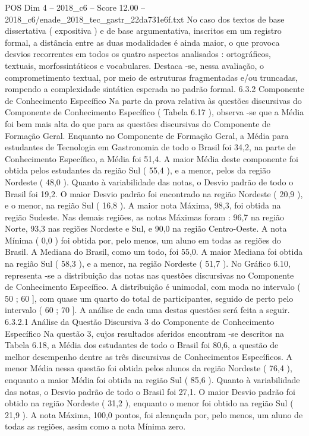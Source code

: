 \begin{textsample}{POS Dim 4 – 2018\_c6 – Score 12.00 – 2018\_c6/enade\_2018\_tec\_gastr\_22da731e6f.txt}
No caso dos textos de base dissertativa ( expositiva ) e de base argumentativa, inscritos em um registro formal, a distância entre as duas modalidades é ainda maior, o que provoca desvios recorrentes em todos os quatro aspectos analisados : ortográficos, textuais, morfossintáticos e vocabulares.
Destaca -se, nessa avaliação, o comprometimento textual, por meio de estruturas fragmentadas e/ou truncadas, rompendo a complexidade sintática esperada no padrão formal. 6.3.2 Componente de Conhecimento Específico Na parte da prova relativa às questões discursivas do Componente de Conhecimento Específico ( Tabela 6.17 ), observa -se que a Média foi bem mais alta do que para as questões discursivas do Componente de Formação Geral.
Enquanto no Componente de Formação Geral, a Média para estudantes de Tecnologia em Gastronomia de todo o Brasil foi 34,2, na parte de Conhecimento Específico, a Média foi 51,4.
A maior Média deste componente foi obtida pelos estudantes da região Sul ( 55,4 ), e a menor, pelos da região Nordeste ( 48,0 ).
Quanto à variabilidade das notas, o Desvio padrão de todo o Brasil foi 19,2.
O maior Desvio padrão foi encontrado na região Nordeste ( 20,9 ), e o menor, na região Sul ( 16,8 ).
A maior nota Máxima, 98,3, foi obtida na região Sudeste.
Nas demais regiões, as notas Máximas foram : 96,7 na região Norte, 93,3 nas regiões Nordeste e Sul, e 90,0 na região Centro-Oeste.
A nota Mínima ( 0,0 ) foi obtida por, pelo menos, um aluno em todas as regiões do Brasil.
A Mediana do Brasil, como um todo, foi 55,0.
A maior Mediana foi obtida na região Sul ( 58,3 ), e a menor, na região Nordeste ( 51,7 ).
No Gráfico 6.10, representa -se a distribuição das notas nas questões discursivas no Componente de Conhecimento Específico.
A distribuição é unimodal, com moda no intervalo ( 50 ; 60 ], com quase um quarto do total de participantes, seguido de perto pelo intervalo ( 60 ; 70 ].
A análise de cada uma destas questões será feita a seguir. 6.3.2.1 Análise da Questão Discursiva 3 do Componente de Conhecimento Específico Na questão 3, cujos resultados aferidos encontram -se descritos na Tabela 6.18, a Média dos estudantes de todo o Brasil foi 80,6, a questão de melhor desempenho dentre as três discursivas de Conhecimentos Específicos.
A menor Média nessa questão foi obtida pelos alunos da região Nordeste ( 76,4 ), enquanto a maior Média foi obtida na região Sul ( 85,6 ).
Quanto à variabilidade das notas, o Desvio padrão de todo o Brasil foi 27,1.
O maior Desvio padrão foi obtido na região Nordeste ( 31,2 ), enquanto o menor foi obtido na região Sul ( 21,9 ).
A nota Máxima, 100,0 pontos, foi alcançada por, pelo menos, um aluno de todas as regiões, assim como a nota Mínima zero.

\end{textsample}
